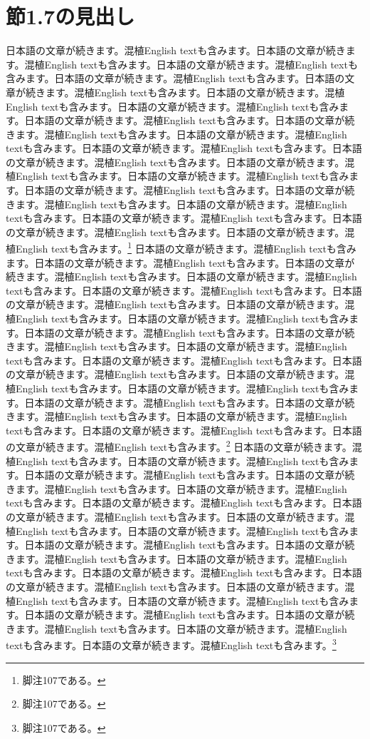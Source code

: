 \documentclass[pdflatex,book]{jlreq}
\begin{document}
\section{節1.7の見出し}
日本語の文章が続きます。混植English textも含みます。日本語の文章が続きます。混植English textも含みます。日本語の文章が続きます。混植English textも含みます。日本語の文章が続きます。混植English textも含みます。日本語の文章が続きます。混植English textも含みます。日本語の文章が続きます。混植English textも含みます。日本語の文章が続きます。混植English textも含みます。日本語の文章が続きます。混植English textも含みます。日本語の文章が続きます。混植English textも含みます。日本語の文章が続きます。混植English textも含みます。日本語の文章が続きます。混植English textも含みます。日本語の文章が続きます。混植English textも含みます。日本語の文章が続きます。混植English textも含みます。日本語の文章が続きます。混植English textも含みます。日本語の文章が続きます。混植English textも含みます。日本語の文章が続きます。混植English textも含みます。日本語の文章が続きます。混植English textも含みます。日本語の文章が続きます。混植English textも含みます。日本語の文章が続きます。混植English textも含みます。日本語の文章が続きます。混植English textも含みます。\footnote{脚注107である。}
日本語の文章が続きます。混植English textも含みます。日本語の文章が続きます。混植English textも含みます。日本語の文章が続きます。混植English textも含みます。日本語の文章が続きます。混植English textも含みます。日本語の文章が続きます。混植English textも含みます。日本語の文章が続きます。混植English textも含みます。日本語の文章が続きます。混植English textも含みます。日本語の文章が続きます。混植English textも含みます。日本語の文章が続きます。混植English textも含みます。日本語の文章が続きます。混植English textも含みます。日本語の文章が続きます。混植English textも含みます。日本語の文章が続きます。混植English textも含みます。日本語の文章が続きます。混植English textも含みます。日本語の文章が続きます。混植English textも含みます。日本語の文章が続きます。混植English textも含みます。日本語の文章が続きます。混植English textも含みます。日本語の文章が続きます。混植English textも含みます。日本語の文章が続きます。混植English textも含みます。日本語の文章が続きます。混植English textも含みます。日本語の文章が続きます。混植English textも含みます。\footnote{脚注107である。}
日本語の文章が続きます。混植English textも含みます。日本語の文章が続きます。混植English textも含みます。日本語の文章が続きます。混植English textも含みます。日本語の文章が続きます。混植English textも含みます。日本語の文章が続きます。混植English textも含みます。日本語の文章が続きます。混植English textも含みます。日本語の文章が続きます。混植English textも含みます。日本語の文章が続きます。混植English textも含みます。日本語の文章が続きます。混植English textも含みます。日本語の文章が続きます。混植English textも含みます。日本語の文章が続きます。混植English textも含みます。日本語の文章が続きます。混植English textも含みます。日本語の文章が続きます。混植English textも含みます。日本語の文章が続きます。混植English textも含みます。日本語の文章が続きます。混植English textも含みます。日本語の文章が続きます。混植English textも含みます。日本語の文章が続きます。混植English textも含みます。日本語の文章が続きます。混植English textも含みます。日本語の文章が続きます。混植English textも含みます。日本語の文章が続きます。混植English textも含みます。\footnote{脚注107である。}
\end{document}
